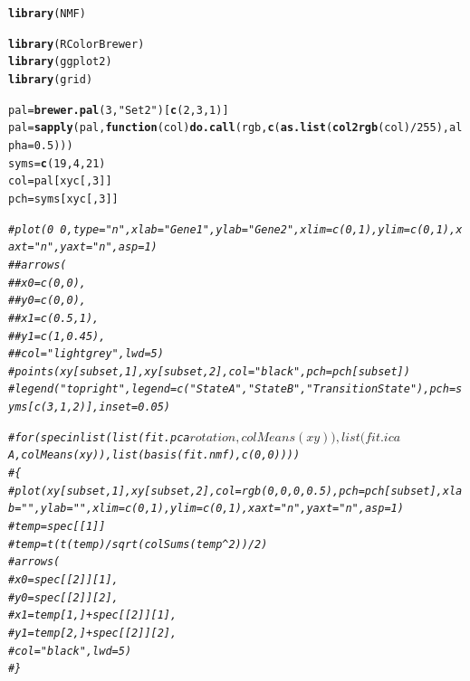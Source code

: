 \documentclass{article}\usepackage[]{graphicx}\usepackage[]{color}
\makeatletter
\newcommand{\hlnum}[1]{\textcolor[rgb]{0.686,0.059,0.569}{#1}}%
\newcommand{\hlstr}[1]{\textcolor[rgb]{0.192,0.494,0.8}{#1}}%
\newcommand{\hlcom}[1]{\textcolor[rgb]{0.678,0.584,0.686}{\textit{#1}}}%
\newcommand{\hlopt}[1]{\textcolor[rgb]{0,0,0}{#1}}%
\newcommand{\hlstd}[1]{\textcolor[rgb]{0.345,0.345,0.345}{#1}}%
\newcommand{\hlkwa}[1]{\textcolor[rgb]{0.161,0.373,0.58}{\textbf{#1}}}%
\newcommand{\hlkwb}[1]{\textcolor[rgb]{0.69,0.353,0.396}{#1}}%
\newcommand{\hlkwc}[1]{\textcolor[rgb]{0.333,0.667,0.333}{#1}}%
\newcommand{\hlkwd}[1]{\textcolor[rgb]{0.737,0.353,0.396}{\textbf{#1}}}%
\newenvironment{kframe}{%
 \def\at@end@of@kframe{}%
 \ifinner\ifhmode%
  \def\at@end@of@kframe{\end{minipage}}%
  \begin{minipage}{\columnwidth}%
 \fi\fi%
 \def\FrameCommand##1{\hskip\@totalleftmargin \hskip-\fboxsep
 \colorbox{shadecolor}{##1}\hskip-\fboxsep
     \hskip-\linewidth \hskip-\@totalleftmargin \hskip\columnwidth}%
 \MakeFramed {\advance\hsize-\width
   \@totalleftmargin\z@ \linewidth\hsize
   \@setminipage}}%
 {\par\unskip\endMakeFramed%
 \at@end@of@kframe}
\newenvironment{knitrout}{}{} %
\makeatother
\begin{document}
\begin{knitrout}
\color{fgcolor}\begin{kframe}
\begin{alltt}
\hlkwd{library}\hlstd{(NMF)}
\end{alltt}


{\ttfamily\noindent\itshape\color{messagecolor}{\#\# Loading required package: methods\\\#\# Loading required package: pkgmaker\\\#\# Loading required package: registry\\\#\# Loading required package: rngtools\\\#\# Loading required package: cluster\\\#\# NMF - BioConductor layer [OK] | Shared memory capabilities [OK] | Cores 3/4}}\begin{alltt}
\hlkwd{library}\hlstd{(RColorBrewer)}
\hlkwd{library}\hlstd{(ggplot2)}
\hlkwd{library}\hlstd{(grid)}

\hlstd{pal} \hlkwb{=} \hlkwd{brewer.pal}\hlstd{(}\hlnum{3}\hlstd{,} \hlstr{"Set2"}\hlstd{)[}\hlkwd{c}\hlstd{(}\hlnum{2}\hlstd{,} \hlnum{3}\hlstd{,} \hlnum{1}\hlstd{)]}
\hlstd{pal} \hlkwb{=} \hlkwd{sapply}\hlstd{(pal,} \hlkwa{function}\hlstd{(}\hlkwc{col}\hlstd{)} \hlkwd{do.call}\hlstd{(rgb,} \hlkwd{c}\hlstd{(}\hlkwd{as.list}\hlstd{(}\hlkwd{col2rgb}\hlstd{(col)}\hlopt{/}\hlnum{255}\hlstd{),} \hlkwc{alpha} \hlstd{=} \hlnum{0.5}\hlstd{)))}
\hlstd{syms} \hlkwb{=} \hlkwd{c}\hlstd{(}\hlnum{19}\hlstd{,} \hlnum{4}\hlstd{,} \hlnum{21}\hlstd{)}
\hlstd{col} \hlkwb{=} \hlstd{pal[xyc[,}\hlnum{3}\hlstd{]]}
\hlstd{pch} \hlkwb{=} \hlstd{syms[xyc[,}\hlnum{3}\hlstd{]]}

\hlcom{# plot(0 ~ 0, type = "n", xlab = "Gene 1", ylab = "Gene 2", xlim = c(0, 1), ylim = c(0, 1), xaxt = "n", yaxt = "n", asp = 1)}
\hlcom{# # arrows(}
\hlcom{# # 	x0 = c(0, 0), }
\hlcom{# # 	y0 = c(0, 0), }
\hlcom{# # 	x1 = c(0.5, 1), }
\hlcom{# # 	y1 = c(1, 0.45), }
\hlcom{# # 	col = "lightgrey", lwd = 5)}
\hlcom{# points(xy[subset,1], xy[subset,2], col = "black", pch = pch[subset])}
\hlcom{# legend("topright", legend = c("State A", "State B", "Transition State"), pch = syms[c(3, 1, 2)], inset = 0.05)}

\hlcom{# for (spec in list(list(fit.pca$rotation, colMeans(xy)), list(fit.ica$A, colMeans(xy)), list(basis(fit.nmf), c(0, 0))))}
\hlcom{# \{}
\hlcom{# 	plot(xy[subset,1], xy[subset,2], col = rgb(0, 0, 0, 0.5), pch = pch[subset], xlab = "", ylab = "", xlim = c(0, 1), ylim = c(0, 1), xaxt = "n", yaxt = "n", asp = 1)}
\hlcom{# 	temp = spec[[1]]}
\hlcom{# 	temp = t(t(temp) / sqrt(colSums(temp^2)) / 2)}
\hlcom{# 	arrows(}
\hlcom{# 		x0 = spec[[2]][1], }
\hlcom{# 		y0 = spec[[2]][2], }
\hlcom{# 		x1 = temp[1,] + spec[[2]][1], }
\hlcom{# 		y1 = temp[2,] + spec[[2]][2], }
\hlcom{# 		col = "black", lwd = 5)}
\hlcom{# \}}


\end{alltt}
\end{kframe}
\end{knitrout}
\end{document}
